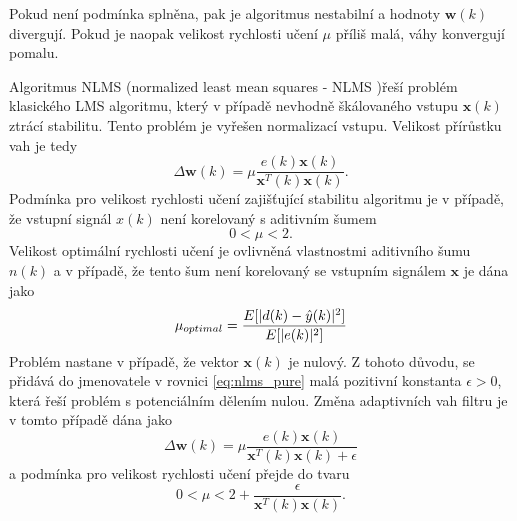 Pokud není podmínka splněna, pak je algoritmus nestabilní a hodnoty $\textbf{w}(k)$ divergují. Pokud je naopak velikost rychlosti učení $\mu$ příliš malá, váhy konvergují pomalu.
\par 
Algoritmus NLMS (normalized least mean squares - NLMS \cite{haykin})řeší problém klasického LMS algoritmu, který v případě nevhodně škálovaného vstupu $\textbf{x}(k)$ ztrácí stabilitu. Tento problém je vyřešen normalizací vstupu. Velikost přírůstku vah je tedy
\begin{equation}\label{eq:nlms_pure}
    \Delta \textbf{w}(k)=\mu\frac{e(k)\textbf{x}(k)}{\textbf{x}^T(k)\textbf{x}(k)}.
\end{equation}
Podmínka pro velikost rychlosti učení zajišťující stabilitu algoritmu je v případě, že vstupní signál $x(k)$ není korelovaný s aditivním šumem
\begin{equation}
0 < \mu < 2.
\end{equation}
Velikost optimální rychlosti učení je ovlivněná vlastnostmi aditivního šumu $n(k)$ a v případě, že tento šum není korelovaný se vstupním signálem $\textbf{x}$ je dána jako
\begin{equation}
    \mu_{optimal}=\frac{E[\lvert d(k)-\hat{y}(k)\rvert^2]}{E[\lvert e(k)\rvert^2]}
\end{equation}
Problém nastane v případě, že vektor $\textbf{x}(k)$ je nulový. Z tohoto důvodu, se přidává do jmenovatele v rovnici \ref{eq:nlms_pure} malá pozitivní konstanta $\epsilon > 0$, která řeší problém s potenciálním dělením nulou. Změna adaptivních vah filtru je v tomto případě dána jako
\begin{equation}\label{eq:nlms_adapt}
    \Delta \textbf{w}(k)=\mu\frac{e(k)\textbf{x}(k)}{\textbf{x}^T(k)\textbf{x}(k)+\epsilon}
\end{equation}
a podmínka pro velikost rychlosti učení přejde do tvaru
\begin{equation}
    0 < \mu < 2 + \frac{\epsilon}{\textbf{x}^T(k)\textbf{x}(k)}.
\end{equation}
